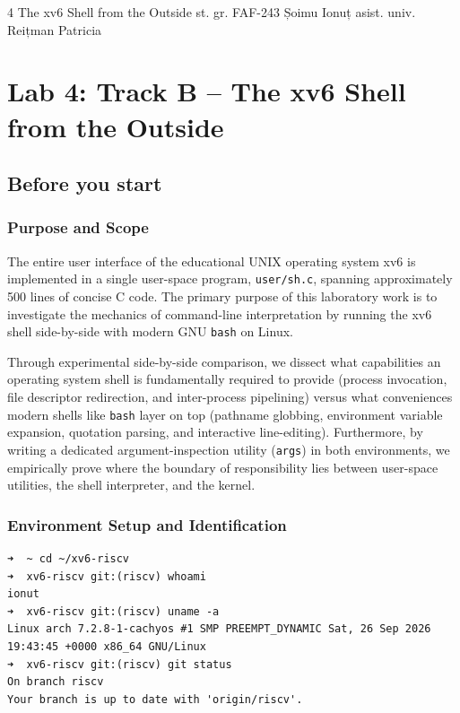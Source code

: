\documentclass{labreport}
\begin{document}
\labtitle
    {4}
    {The xv6 Shell from the Outside}
    {st. gr. FAF-243}
    {Șoimu Ionuț}
    {asist. univ.\\[0.15cm] Reițman Patricia}

\tableofcontents
\newpage

\section{Lab 4: Track B -- The xv6 Shell from the Outside}

\subsection{Before you start}

\subsubsection*{Purpose and Scope}
The entire user interface of the educational UNIX operating system xv6 is implemented in a single user-space program, \texttt{user/sh.c}, spanning approximately 500 lines of concise C code. The primary purpose of this laboratory work is to investigate the mechanics of command-line interpretation by running the xv6 shell side-by-side with modern GNU \texttt{bash} on Linux.

Through experimental side-by-side comparison, we dissect what capabilities an operating system shell is fundamentally required to provide (process invocation, file descriptor redirection, and inter-process pipelining) versus what conveniences modern shells like \texttt{bash} layer on top (pathname globbing, environment variable expansion, quotation parsing, and interactive line-editing). Furthermore, by writing a dedicated argument-inspection utility (\texttt{args}) in both environments, we empirically prove where the boundary of responsibility lies between user-space utilities, the shell interpreter, and the kernel.

\subsubsection*{Environment Setup and Identification}
\begin{lstlisting}[style=bash]
➜  ~ cd ~/xv6-riscv
➜  xv6-riscv git:(riscv) whoami
ionut
➜  xv6-riscv git:(riscv) uname -a
Linux arch 7.2.8-1-cachyos #1 SMP PREEMPT_DYNAMIC Sat, 26 Sep 2026 19:43:45 +0000 x86_64 GNU/Linux
➜  xv6-riscv git:(riscv) git status
On branch riscv
Your branch is up to date with 'origin/riscv'.
\end{lstlisting}
\end{document}
